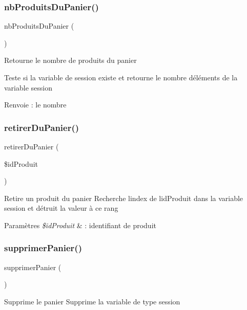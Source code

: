 \subsubsection{\texorpdfstring{nb\+Produits\+Du\+Panier()}{nbProduitsDuPanier()}}
{\footnotesize\ttfamily nb\+Produits\+Du\+Panier (\begin{DoxyParamCaption}{ }\end{DoxyParamCaption})}

Retourne le nombre de produits du panier

Teste si la variable de session existe et retourne le nombre d\textquotesingle{}éléments de la variable session \begin{DoxyReturn}{Renvoie}
\+: le nombre 
\end{DoxyReturn}
\mbox{\label{fonctions_8inc_8php_a9abbd8b2a086aad084ad4ebcaa79d740}} 
\subsubsection{\texorpdfstring{retirer\+Du\+Panier()}{retirerDuPanier()}}
{\footnotesize\ttfamily retirer\+Du\+Panier (\begin{DoxyParamCaption}\item[{}]{\$id\+Produit }\end{DoxyParamCaption})}

Retire un produit du panier Recherche l\textquotesingle{}index de l\textquotesingle{}id\+Produit dans la variable session et détruit la valeur à ce rang 
\begin{DoxyParams}{Paramètres}
{\em \$id\+Produit} & \+: identifiant de produit \\
\hline
\end{DoxyParams}
\mbox{\label{fonctions_8inc_8php_a6d2472e7b8bc9e7d0f546cece9d4f6c8}} 
\subsubsection{\texorpdfstring{supprimer\+Panier()}{supprimerPanier()}}
{\footnotesize\ttfamily supprimer\+Panier (\begin{DoxyParamCaption}{ }\end{DoxyParamCaption})}

Supprime le panier Supprime la variable de type session 